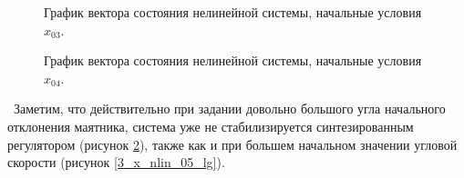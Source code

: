 \begin{figure}[!h]
\caption{График вектора состояния нелинейной системы, начальные условия $x_{03}$.}
\label{3_x_nlin_03_lg}
\end{figure}

\begin{figure}[!h]
\caption{График вектора состояния нелинейной системы, начальные условия $x_{04}$.}
\label{3_x_nlin_04_lg}
\end{figure}

\newpage
\,
\newpage
Заметим, что действительно при задании довольно большого угла начального отклонения маятника, система уже не стабилизируется синтезированным регулятором (рисунок \ref{3_x_nlin_04_lg}), также как и при большем начальном значении угловой скорости (рисунок \ref{3_x_nlin_05_lg}). 

